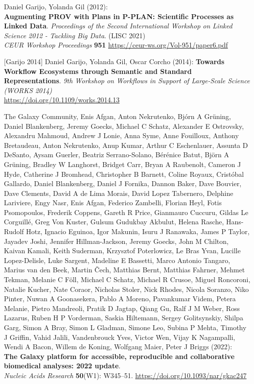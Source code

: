 \documentclass[10pt,letterpaper]{article}
\begin{document}
\begin{thebibliography}{10}
\begin{small}
Daniel Garijo, Yolanda Gil (2012):\\
\textbf{Augmenting PROV with Plans in P-PLAN: Scientific Processes as Linked Data}.
\emph{Proceedings of the Second International Workshop on Linked Science 2012 - Tackling Big Data}. (LISC 2021)\\
\emph{CEUR Workshop Proceedings} \textbf{951}
\url{https://ceur-ws.org/Vol-951/paper6.pdf}

[Garijo 2014] Daniel Garijo, Yolanda Gil, Oscar Corcho (2014):
\textbf{Towards Workflow Ecosystems through Semantic and Standard Representations}.
\emph{9th Workshop on Workflows in Support of Large-Scale Science (WORKS 2014)}\\
\url{https://doi.org/10.1109/works.2014.13} 

The Galaxy Community, Enis Afgan, Anton Nekrutenko, Bjórn A Grüning, Daniel Blankenberg, Jeremy Goecks, Michael C Schatz, Alexander E Ostrovsky, Alexandru Mahmoud, Andrew J Lonie, Anna Syme, Anne Fouilloux, Anthony Bretaudeau, Anton Nekrutenko, Anup Kumar, Arthur C Eschenlauer, Assunta D DeSanto, Aysam Guerler, Beatriz Serrano-Solano, Bérénice Batut, Björn A Grüning, Bradley W Langhorst, Bridget Carr, Bryan A Raubenolt, Cameron J Hyde, Catherine J Bromhead, Christopher B Barnett, Coline Royaux, Cristóbal Gallardo, Daniel Blankenberg, Daniel J Fornika, Dannon Baker, Dave Bouvier, Dave Clements, David A de Lima Morais, David Lopez Tabernero, Delphine Lariviere, Engy Nasr, Enis Afgan, Federico Zambelli, Florian Heyl, Fotis Psomopoulos, Frederik Coppens, Gareth R Price, Gianmauro Cuccuru, Gildas Le Corguillé, Greg Von Kuster, Gulsum Gudukbay Akbulut, Helena Rasche, Hans-Rudolf Hotz, Ignacio Eguinoa, Igor Makunin, Isuru J Ranawaka, James P Taylor, Jayadev Joshi, Jennifer Hillman-Jackson, Jeremy Goecks, John M Chilton, Kaivan Kamali, Keith Suderman, Krzysztof Poterlowicz, Le Bras Yvan, Lucille Lopez-Delisle, Luke Sargent, Madeline E Bassetti, Marco Antonio Tangaro, Marius van den Beek, Martin Čech, Matthias Bernt, Matthias Fahrner, Mehmet Tekman, Melanie C Föll, Michael C Schatz, Michael R Crusoe, Miguel Roncoroni, Natalie Kucher, Nate Coraor, Nicholas Stoler, Nick Rhodes, Nicola Soranzo, Niko Pinter, Nuwan A Goonasekera, Pablo A Moreno, Pavankumar Videm, Petera Melanie, Pietro Mandreoli, Pratik D Jagtap, Qiang Gu, Ralf J M Weber, Ross Lazarus, Ruben H P Vorderman, Saskia Hiltemann, Sergey Golitsynskiy, Shilpa Garg, Simon A Bray, Simon L Gladman, Simone Leo, Subina P Mehta, Timothy J Griffin, Vahid Jalili, Vandenbrouck Yves, Victor Wen, Vijay K Nagampalli, Wendi A Bacon, Willem de Koning, Wolfgang Maier, Peter J Briggs (2022):\\
\textbf{The Galaxy platform for accessible, reproducible and collaborative biomedical analyses: 2022 update}.\\
\emph{Nucleic Acids Research} \textbf{50}(W1): W345--51.
\url{https://doi.org/10.1093/nar/gkac247}


\end{small}
\end{thebibliography}
\end{document}

